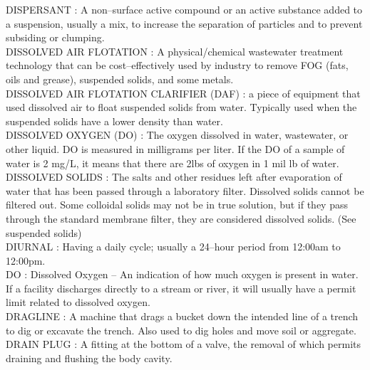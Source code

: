 \vspace{0.15cm}
DISPERSANT :  A non–surface active compound or an active substance added to a suspension, usually a mix, to increase the separation of particles and to prevent subsiding or clumping.\\
\vspace{0.15cm}
DISSOLVED AIR FLOTATION :   A physical/chemical wastewater treatment technology that can be cost–effectively used by industry to remove FOG (fats, oils and grease), suspended solids, and some metals.\\
\vspace{0.15cm}
DISSOLVED AIR FLOTATION CLARIFIER (DAF) :  a piece of equipment that used dissolved air to float suspended solids from water. Typically used when the suspended solids have a lower density than water.\\
\vspace{0.15cm}
DISSOLVED OXYGEN (DO) :   The oxygen dissolved in water, wastewater, or other liquid. DO is measured in milligrams per liter. If the DO of a sample of water is 2 mg/L, it means that there are 2lbs of oxygen in 1 mil lb of water.\\
\vspace{0.15cm}
DISSOLVED SOLIDS :  The salts and other residues left after evaporation of water that has been passed through a laboratory filter. Dissolved solids cannot be filtered out. Some colloidal solids may not be in true solution, but if they pass through the standard membrane filter, they are considered dissolved solids. (See suspended solids)\\
\vspace{0.15cm}
DIURNAL :  Having a daily cycle; usually a 24–hour period from 12:00am to 12:00pm.\\
\vspace{0.15cm}
DO :  Dissolved Oxygen –  An indication of how much oxygen is present in water. If a facility discharges directly to a stream or river, it will usually have a permit limit related to dissolved oxygen.\\
\vspace{0.15cm}
DRAGLINE :  A machine that drags a bucket down the intended line of a trench to dig or excavate the trench. Also used to dig holes and move soil or aggregate. \\
\vspace{0.15cm}
DRAIN PLUG :   A fitting at the bottom of a valve, the removal of which permits draining and flushing the body cavity.\\
\vspace{0.15cm}
